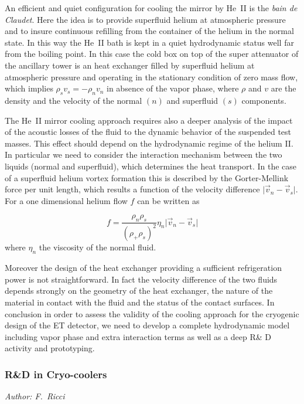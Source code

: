 An efficient and quiet configuration for cooling the mirror by He~II is the {\it bain de Claudet}. Here the idea is to provide  superfluid helium at atmospheric pressure and to insure continuous refilling from the container of the helium in the normal state. In this way the He~II bath is kept  in a quiet hydrodynamic status well far from the boiling point.
In this case the cold box on top of the super attenuator of the ancillary tower  is an  heat exchanger   filled by superfluid helium at atmospheric pressure and operating in the stationary condition of zero mass flow, which  implies $\rho_s v_s = - \rho_n v_n $ in absence of the vapor phase, where $\rho$ and $v$ are the density and the velocity of the normal $(n)$ and superfluid $(s)$ components. 
 

  The He~II mirror  cooling approach  requires also a deeper analysis of the  impact of  the acoustic losses of the fluid to the dynamic behavior of the suspended  test masses. 
This effect should depend  on the hydrodynamic regime of the  helium II. In particular  we need to consider the interaction mechanism between the two liquids (normal and superfluid), which determines the heat transport. In the case of a superfluid helium vortex formation this is  described by the Gorter-Mellink  force per unit length, which results  a function of the velocity  difference $\vert \vec v_n - \vec v_s \vert$. For a one dimensional helium flow $f$ can be written as  

\begin{equation}
f = {\frac{\rho_n \rho_s}{({\rho_ +\rho_s})^2}} \eta_n \vert \vec v_n - \vec v_s \vert
\label{eq:Gorter_Mellink}
\end{equation}  
\noindent
where $\eta_n$ the viscosity of the normal fluid. 

Moreover   the design of the heat exchanger providing a sufficient refrigeration power is not straightforward. In fact the velocity difference of the two fluids depends  strongly  on the geometry of the heat exchanger, the nature of the material in contact with the fluid  and the status of the contact surfaces. In conclusion in order to  assess  the validity of the cooling approach for the cryogenic design of the ET detector, we need  to develop a complete hydrodynamic model including   vapor phase and  extra interaction terms as well as a deep R\& D activity and prototyping.


\FloatBarrier
\subsubsection{R\&D in Cryo-coolers}
\label{cryo_infrastructure_RD}
\emph{
Author: F.\ Ricci}

